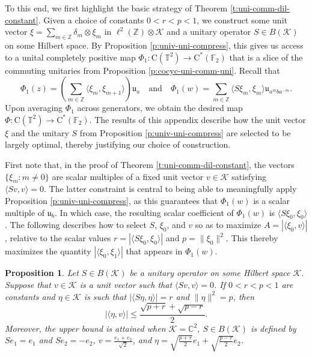 \documentclass[10pt]{amsart}
\newcommand{\bC}{{\mathbb{C}}}
\newcommand{\bF}{{\mathbb{F}}}
\newcommand{\bT}{{\mathbb{T}}}
\newcommand{\bZ}{{\mathbb{Z}}}
\newcommand{\K}{{\mathcal{K}}}
\newcommand{\rC}{\mathrm{C}}
\newtheorem{proposition}[theorem]{Proposition}
\begin{document}
To this end, we first highlight the basic strategy of Theorem \ref{t:uni-comm-dil-constant}. Given a choice of constants $0<r<p<1$, we construct some unit vector $\xi = \sum_{m\in\bZ}\delta_m\otimes\xi_m$ in $\ell^2(\bZ)\otimes\K$ and a unitary operator $S\in B(\K)$ on some Hilbert space. By Proposition \ref{p:univ-uni-compress}, this gives us access to a unital completely positive map $\Phi_1:\rC(\bT^2)\rightarrow\rC^*(\bF_2)$ that is a slice of the commuting unitaries from Proposition \ref{p:cocyc-uni-comm-uni}. Recall that
\[
    \Phi_1(z) = \left( \sum_{m\in\bZ}\langle \xi_m, \xi_{m+1}\rangle \right)\mathfrak{u}_a \quad \text{and} \quad \Phi_1(w) = \sum_{m\in\bZ}\langle S\xi_m, \xi_m\rangle \mathfrak{u}_{a^mba^{-m}}.
\]
Upon averaging $\Phi_1$ across generators, we obtain the desired map $\Phi:\rC(\bT^2)\rightarrow\rC^*(\bF_2)$. The results of this appendix describe how the unit vector $\xi$ and the unitary $S$ from Proposition \ref{p:univ-uni-compress} are selected to be largely optimal, thereby justifying our choice of construction.

First note that, in the proof of Theorem \ref{t:uni-comm-dil-constant}, the vectors $\{\xi_m: m\neq 0\}$ are scalar multiples of a fixed unit vector $v\in\K$ satisfying $\langle Sv, v\rangle = 0$. The latter constraint is central to being able to meaningfully apply Proposition \ref{p:univ-uni-compress}, as this guarantees that $\Phi_1(w)$ is a scalar multiple of $\mathfrak{u}_b$. In which case, the resulting scalar coefficient of $\Phi_1(w)$ is $\langle S\xi_0, \xi_0\rangle$. The following describes how to select $S$, $\xi_0$, and $v$ so as to maximize $A = |\langle \xi_0, v\rangle|$, relative to the scalar values $r = |\langle S\xi_0, \xi_0\rangle|$ and $p= \|\xi_0\|^2$. This thereby maximizes the quantity $|\langle\xi_0,\xi_1\rangle|$ that appears in $\Phi_1(w)$.

\begin{proposition}\label{p:optimize-1}
    Let $S\in B(\K)$ be a unitary operator on some Hilbert space $\K$. Suppose that $v\in\K$ is a unit vector such that $\langle Sv, v\rangle = 0$. If $0<r<p<1$ are constants and $\eta\in\K$ is such that $|\langle S\eta, \eta\rangle| = r$ and $\|\eta\|^2 = p$, then
    \begin{equation}\label{eq:optimize-1}
        |\langle \eta, v\rangle| \leq \frac{\sqrt{p+r}+\sqrt{p-r}}{2}.
    \end{equation}
    Moreover, the upper bound is attained when $\K = \bC^2$, $S\in B(\K)$ is defined by $Se_1 = e_1$ and $Se_2 = -e_2$, $v = \frac{e_1+e_2}{\sqrt{2}}$, and $\eta = \sqrt{\frac{p+r}{2}}e_1 + \sqrt{\frac{p-r}{2}}e_2$.
\end{proposition}
\end{document}
